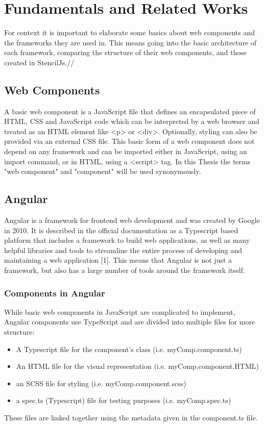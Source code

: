 \chapter{Fundamentals and Related Works}
\label{cha:fundamentals}
For context it is important to elaborate some basics about web components and the frameworks they are used in. This means going into the basic architecture of each framework, comparing the structure of their web components, and those created in StencilJs.//

\section{Web Components}
A basic web component is a JavaScript file that defines an encapsulated piece of HTML, CSS and JavaScript code which can be interpreted by a web browser and treated as an HTML element like <p> or <div>. Optionally, styling can also be provided via an external CSS file. This basic form of a web component does not depend on any framework and can be imported either in JavaScript, using an import command, or in HTML, using a <script> tag. In this Thesis the terms "web component" and "component" will be used synonymously.

\section{Angular}
Angular is a framework for frontend web development and was created by Google in 2010. It is described in the official documentation as a Typescript based platform that includes a framework to build web applications, as well as many helpful libraries and tools to streamline the entire process of developing and maintaining a web application [1]. This means that Angular is not just a framework, but also has a large number of tools around the framework itself.

\subsection{Components in Angular}
While basic web components in JavaScript are complicated to implement, Angular components use TypeScript and are divided into multiple files for more structure:

\begin{itemize}
\item A Typescript file for the component’s class (i.e. myComp.component.ts)
\item An HTML file for the visual representation (i.e. myComp.component.HTML)
\item an SCSS file for styling (i.e. myComp.component.scss)
\item a spec.ts (Typescript) file for testing purposes (i.e. myComp.spec.ts)
\end{itemize}
These files are linked together using the metadata given in the component.ts file.

